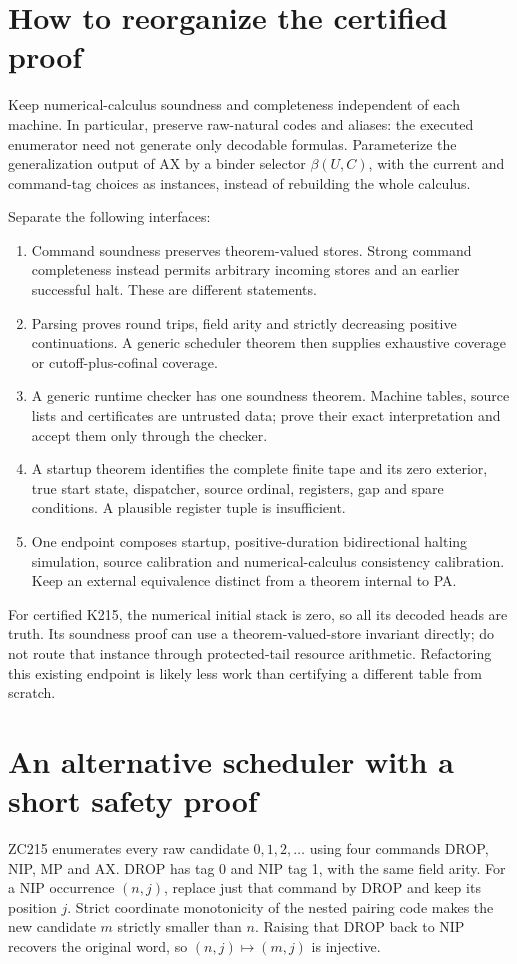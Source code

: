 \documentclass[11pt]{article}
\begin{document}
\section{How to reorganize the certified proof}
Keep numerical-calculus soundness and completeness independent of each machine. In particular, preserve raw-natural codes and aliases: the executed enumerator need not generate only decodable formulas. Parameterize the generalization output of AX by a binder selector $\beta(U,C)$, with the current and command-tag choices as instances, instead of rebuilding the whole calculus.

Separate the following interfaces:
\begin{enumerate}
\item Command soundness preserves theorem-valued stores. Strong command completeness instead permits arbitrary incoming stores and an earlier successful halt. These are different statements.
\item Parsing proves round trips, field arity and strictly decreasing positive continuations. A generic scheduler theorem then supplies exhaustive coverage or cutoff-plus-cofinal coverage.
\item A generic runtime checker has one soundness theorem. Machine tables, source lists and certificates are untrusted data; prove their exact interpretation and accept them only through the checker.
\item A startup theorem identifies the complete finite tape and its zero exterior, true start state, dispatcher, source ordinal, registers, gap and spare conditions. A plausible register tuple is insufficient.
\item One endpoint composes startup, positive-duration bidirectional halting simulation, source calibration and numerical-calculus consistency calibration. Keep an external equivalence distinct from a theorem internal to PA.
\end{enumerate}
For certified K215, the numerical initial stack is zero, so all its decoded heads are truth. Its soundness proof can use a theorem-valued-store invariant directly; do not route that instance through protected-tail resource arithmetic. Refactoring this existing endpoint is likely less work than certifying a different table from scratch.

\section{An alternative scheduler with a short safety proof}
ZC215 enumerates every raw candidate $0,1,2,\ldots$ using four commands DROP, NIP, MP and AX. DROP has tag 0 and NIP tag 1, with the same field arity. For a NIP occurrence $(n,j)$, replace just that command by DROP and keep its position $j$. Strict coordinate monotonicity of the nested pairing code makes the new candidate $m$ strictly smaller than $n$. Raising that DROP back to NIP recovers the original word, so $(n,j)\mapsto(m,j)$ is injective.
\end{document}
